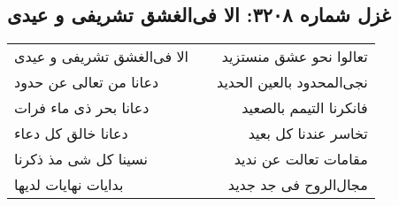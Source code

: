 \begin{center}
\section*{غزل شماره ۳۲۰۸: الا فی‌الغشق تشریفی و عیدی}
\label{sec:3208}
\begin{longtable}{l p{0.5cm} r}
الا فی‌الغشق تشریفی و عیدی
&&
تعالوا نحو عشق منستزید
\\
دعانا من تعالی عن حدود
&&
نجی‌المحدود بالعین الحدید
\\
دعانا بحر ذی ماء فرات
&&
فانکرنا التیمم بالصعید
\\
دعانا خالق کل دعاء
&&
تخاسر عندنا کل بعید
\\
نسینا کل شی مذ ذکرنا
&&
مقامات تعالت عن ندید
\\
بدایات نهایات لدیها
&&
مجال‌الروح فی جد جدید
\\
\end{longtable}
\end{center}
